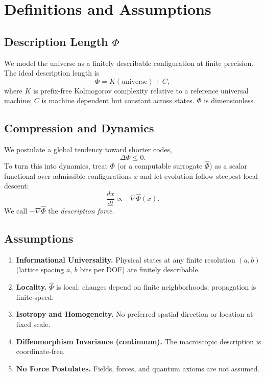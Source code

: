 \documentclass[aps,preprint,onecolumn,longbibliography,nofootinbib]{revtex4-2}
\numberwithin{equation}{section}        %
\begin{document}
\section{Definitions and Assumptions}

\subsection{Description Length $\Phi$}
We model the universe as a finitely describable configuration at finite precision. The ideal description length is
\begin{equation}
\Phi = K(\text{universe}) + C, \label{eq:Kdef}
\end{equation}
where $K$ is prefix-free Kolmogorov complexity relative to a reference universal machine; $C$ is machine dependent but constant across states. $\Phi$ is dimensionless.

\subsection{Compression and Dynamics}
We postulate a global tendency toward shorter codes,
\begin{equation}
\Delta \Phi \le 0. \label{eq:compressive}
\end{equation}
To turn this into dynamics, treat $\Phi$ (or a computable surrogate $\widehat\Phi$) as a scalar functional over admissible configurations $x$ and let evolution follow steepest local descent:
\begin{equation}
\frac{dx}{dt} \propto -\nabla \widehat\Phi(x). \label{eq:desc}
\end{equation}
We call $-\nabla\widehat\Phi$ the \emph{description force}.

\subsection*{Assumptions}
\begin{enumerate}
\item \textbf{Informational Universality.} Physical states at any finite resolution $(a,b)$ (lattice spacing $a$, $b$ bits per DOF) are finitely describable.
\item \textbf{Locality.} $\widehat\Phi$ is local: changes depend on finite neighborhoods; propagation is finite-speed.
\item \textbf{Isotropy and Homogeneity.} No preferred spatial direction or location at fixed scale.
\item \textbf{Diffeomorphism Invariance (continuum).} The macroscopic description is coordinate-free.
\item \textbf{No Force Postulates.} Fields, forces, and quantum axioms are not assumed.
\end{enumerate}
\end{document}
